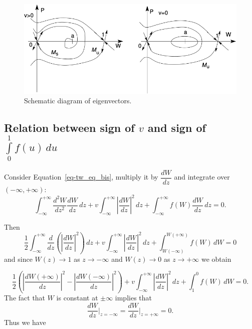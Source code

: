 \documentclass[
  letterpaper,
  DIV=11,
  numbers=noendperiod]{scrreprt}
\theoremstyle{plain}
\theoremstyle{definition}
\theoremstyle{plain}
\theoremstyle{remark}
\begin{document}
\begin{figure}

{\centering \includegraphics{fig3.png}

}

\caption{\label{fig-eigenvectorsbistable}Schematic diagram of
eigenvectors.}

\end{figure}

\hypertarget{relation-between-sign-of-v-and-sign-of-intlimits_01-fu-du}{%
\subsection{\texorpdfstring{Relation between sign of \(v\) and sign of
\(\int\limits_0^1 f(u) \, du\)}{Relation between sign of v and sign of \textbackslash int\textbackslash limits\_0\^{}1 f(u) \textbackslash, du}}\label{relation-between-sign-of-v-and-sign-of-intlimits_01-fu-du}}

Consider Equation~\ref{eq-tw_eq_bis}, multiply it by \(\dfrac{dW}{dz}\)
and integrate over \((-\infty, + \infty)\): \[
\int_{-\infty}^{+ \infty}  \dfrac{d^2W}{dz^2} \dfrac{dW}{dz} \, dz + v\int_{-\infty}^{+ \infty} \left|\dfrac{dW}{dz} \right|^2\, dz  + \int_{-\infty}^{+ \infty}f(W)\dfrac{dW}{dz} \, dz =0.
\]

Then \[
\frac 12 \int_{-\infty}^{+ \infty}  \dfrac{d}{dz} \left(\left|\dfrac{dW}{dz}\right |^2\right) \, dz + v\int_{-\infty}^{+ \infty} \left|\dfrac{dW}{dz} \right|^2\, dz  + \int_{W(-\infty)}^{W(+\infty)}f(W) \, dW =0
\] and since \(W(z) \to 1\) as \(z \to - \infty\) and \(W(z) \to 0\) as
\(z \to + \infty\) we obtain

\[
\frac 12 \left( \left|\dfrac{dW(+\infty)}{dz}\right |^2-   \left|\dfrac{dW(-\infty)}{dz}\right |^2\right)  + v\int_{-\infty}^{+ \infty} \left|\dfrac{dW}{dz} \right|^2\, dz  + \int_{1}^{0}f(W) \, dW =0.
\] The fact that \(W\) is constant at \(\pm \infty\) implies that \[
\dfrac{dW}{dz}\Big|_{z=-\infty} = \dfrac{dW}{dz}\Big|_{z=+\infty}=0.
\] Thus we have
\end{document}
